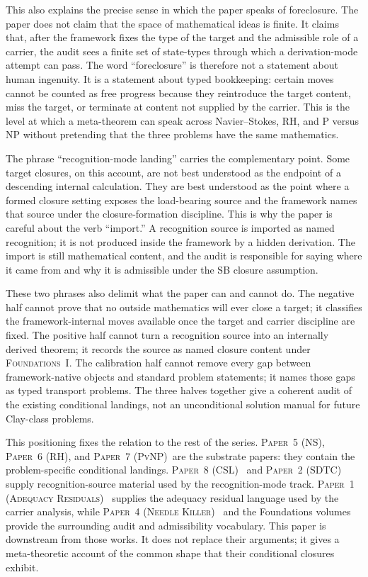 \documentclass[11pt]{article}
\newcommand{\FOne}{\textsc{Foundations~I}}
\newcommand{\PaperAdequacy}{\textsc{Paper~1 (Adequacy Residuals)}}
\newcommand{\PaperSDTC}{\textsc{Paper~2 (SDTC)}}
\newcommand{\PaperNeedles}{\textsc{Paper~4 (Needle Killer)}}
\newcommand{\PaperNS}{\textsc{Paper~5 (NS)}}
\newcommand{\PaperRH}{\textsc{Paper~6 (RH)}}
\newcommand{\PaperPvNP}{\textsc{Paper~7 (PvNP)}}
\newcommand{\PaperCSL}{\textsc{Paper~8 (CSL)}}
\theoremstyle{definition}
\begin{document}
This also explains the precise sense in which the paper speaks of
foreclosure.  The paper does not claim that the space of mathematical
ideas is finite.  It claims that, after the framework fixes the type
of the target and the admissible role of a carrier, the audit sees a
finite set of state-types through which a derivation-mode attempt can
pass.
The word ``foreclosure'' is therefore not a statement about human
ingenuity.  It is a statement about typed bookkeeping: certain moves
cannot be counted as free progress because they reintroduce the target
content, miss the target, or terminate at content not supplied by the
carrier.  This is the level at which a meta-theorem can speak across
Navier--Stokes, RH, and P versus NP without pretending that the three
problems have the same mathematics.

The phrase ``recognition-mode landing'' carries the complementary
point.  Some target closures, on this account, are not best understood
as the endpoint of a descending internal calculation.  They are best
understood as the point where a formed closure setting exposes the
load-bearing source and the framework names that source under the
closure-formation discipline.  This is why the paper is careful about
the verb ``import.''  A recognition source is imported as named
recognition; it is not produced inside the framework by a hidden
derivation.  The import is still mathematical content, and the audit
is responsible for saying where it came from and why it is admissible
under the SB closure assumption.

These two phrases also delimit what the paper can and cannot do.  The
negative half cannot prove that no outside mathematics will ever close
a target; it classifies the framework-internal moves available once
the target and carrier discipline are fixed.  The positive half cannot
turn a recognition source into an internally derived theorem; it
records the source as named closure content under \FOne.  The
calibration half cannot remove every gap between framework-native
objects and standard problem statements; it names those gaps as typed
transport problems.  The three halves together give a coherent audit
of the existing conditional landings, not an unconditional solution
manual for future Clay-class problems.

This positioning fixes the relation to the rest of the series.
\PaperNS, \PaperRH, and \PaperPvNP\ are the substrate papers: they
contain the problem-specific conditional landings.  \PaperCSL\
\cite{Tsiokos2026CSL} and \PaperSDTC\ \cite{Tsiokos2026SDTC} supply
recognition-source material used by the recognition-mode track.
\PaperAdequacy\ \cite{Tsiokos2026XiCompanion} supplies the adequacy
residual language used by the carrier analysis, while
\PaperNeedles\ \cite{Tsiokos2026NeedleKiller} and the Foundations
volumes provide the surrounding audit and admissibility vocabulary.
This paper is downstream from those works.  It does not replace their
arguments; it gives a meta-theoretic account of the common shape that
their conditional closures exhibit.
\end{document}

